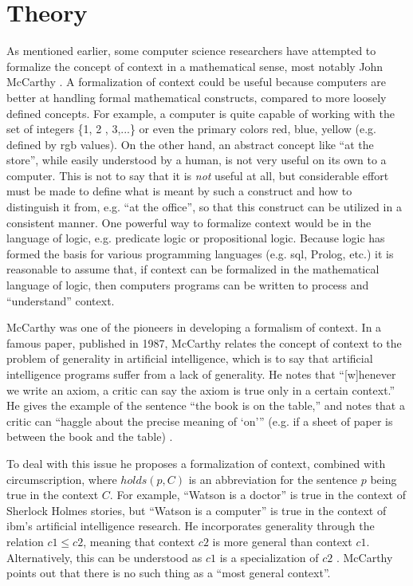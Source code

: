 \section{Theory}
\label{sec:theory}

As mentioned earlier, some computer science researchers have attempted to formalize the concept of context in a mathematical sense, most notably John McCarthy \cite{McCarthy1993} \cite{mccarthy1997formalizing}. A formalization of context could be useful because computers are better at handling formal mathematical constructs, compared to more loosely defined concepts. For example, a computer is quite capable of working with the set of integers \{1, 2 , 3,...\} or even the primary colors {red, blue, yellow} (e.g. defined by \acrshort{rgb} values). On the other hand, an abstract concept like ``at the store'', while easily understood by a human, is not very useful on its own to a computer. This is not to say that it is \emph{not} useful at all, but considerable effort must be made to define what is meant by such a construct and how to distinguish it from, e.g. ``at the office'', so that this construct can be utilized in a consistent manner. One powerful way to formalize context would be in the language of logic, e.g. predicate logic or propositional logic. Because logic has formed the basis for various programming languages (e.g. \acrshort{sql}, Prolog, etc.) it is reasonable to assume that, if context can be formalized in the mathematical language of logic, then computers programs can be written to process and ``understand'' context.

McCarthy was one of the pioneers in developing a formalism of context. In a famous paper, published in 1987, McCarthy relates the concept of context to the problem of generality in artificial intelligence, which is to say that artificial intelligence programs suffer from a lack of generality. He notes that ``[w]henever we write an axiom, a critic can say the axiom is true only in a certain context.'' He gives the example of the sentence ``the book is on the table,'' and notes that a critic can ``haggle about the precise meaning of `on'\thinspace'' (e.g. if a sheet of paper is between the book and the table) \cite{mccarthy1987generality}. 

To deal with this issue he proposes a formalization of context, combined with circumscription, where $holds(p, C)$ is an abbreviation for the sentence $p$ being true in the context $C$. For example, ``Watson is a doctor'' is true in the context of Sherlock Holmes stories, but ``Watson is a computer'' is true in the context of \acrshort{ibm}'s artificial intelligence research. He incorporates generality through the relation $c1 \le c2$, meaning that context $c2$ is more general than context $c1$. Alternatively, this can be understood as $c1$ is a specialization of $c2$ \cite{akman1996steps}. McCarthy points out that there is no such thing as a ``most general context''.

